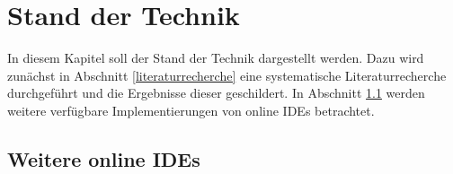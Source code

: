 \chapter{Stand der Technik} \label{stand-der-technik}

In diesem Kapitel soll der Stand der Technik dargestellt werden. Dazu wird zunächst in Abschnitt \ref{literaturrecherche} eine systematische Literaturrecherche durchgeführt und die Ergebnisse dieser geschildert. In Abschnitt \ref{weitere-online-ides} werden weitere verfügbare Implementierungen von online IDEs betrachtet.



\section{Weitere online IDEs} \label{weitere-online-ides}